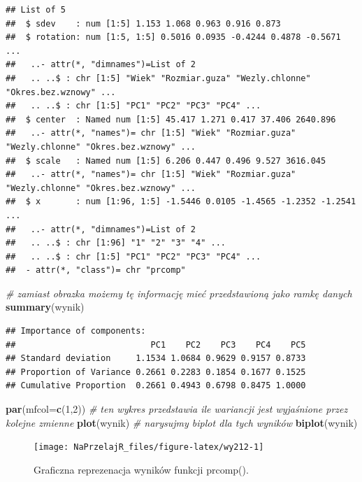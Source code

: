 \documentclass[polish,]{book}
\newenvironment{Shaded}{\begin{snugshade}}{\end{snugshade}}
\newcommand{\CommentTok}[1]{\textcolor[rgb]{0.56,0.35,0.01}{\textit{#1}}}
\newcommand{\DataTypeTok}[1]{\textcolor[rgb]{0.13,0.29,0.53}{#1}}
\newcommand{\DecValTok}[1]{\textcolor[rgb]{0.00,0.00,0.81}{#1}}
\newcommand{\KeywordTok}[1]{\textcolor[rgb]{0.13,0.29,0.53}{\textbf{#1}}}
\newcommand{\NormalTok}[1]{#1}
\begin{document}
\begin{verbatim}
## List of 5
##  $ sdev    : num [1:5] 1.153 1.068 0.963 0.916 0.873
##  $ rotation: num [1:5, 1:5] 0.5016 0.0935 -0.4244 0.4878 -0.5671 ...
##   ..- attr(*, "dimnames")=List of 2
##   .. ..$ : chr [1:5] "Wiek" "Rozmiar.guza" "Wezly.chlonne" "Okres.bez.wznowy" ...
##   .. ..$ : chr [1:5] "PC1" "PC2" "PC3" "PC4" ...
##  $ center  : Named num [1:5] 45.417 1.271 0.417 37.406 2640.896
##   ..- attr(*, "names")= chr [1:5] "Wiek" "Rozmiar.guza" "Wezly.chlonne" "Okres.bez.wznowy" ...
##  $ scale   : Named num [1:5] 6.206 0.447 0.496 9.527 3616.045
##   ..- attr(*, "names")= chr [1:5] "Wiek" "Rozmiar.guza" "Wezly.chlonne" "Okres.bez.wznowy" ...
##  $ x       : num [1:96, 1:5] -1.5446 0.0105 -1.4565 -1.2352 -1.2541 ...
##   ..- attr(*, "dimnames")=List of 2
##   .. ..$ : chr [1:96] "1" "2" "3" "4" ...
##   .. ..$ : chr [1:5] "PC1" "PC2" "PC3" "PC4" ...
##  - attr(*, "class")= chr "prcomp"
\end{verbatim}

\begin{Shaded}
\begin{Highlighting}[]
\CommentTok{# zamiast obrazka możemy tę informację mieć przedstawioną jako ramkę danych}
\KeywordTok{summary}\NormalTok{(wynik)}
\end{Highlighting}
\end{Shaded}

\begin{verbatim}
## Importance of components:
##                           PC1    PC2    PC3    PC4    PC5
## Standard deviation     1.1534 1.0684 0.9629 0.9157 0.8733
## Proportion of Variance 0.2661 0.2283 0.1854 0.1677 0.1525
## Cumulative Proportion  0.2661 0.4943 0.6798 0.8475 1.0000
\end{verbatim}

\begin{Shaded}
\begin{Highlighting}[]
\KeywordTok{par}\NormalTok{(}\DataTypeTok{mfcol=}\KeywordTok{c}\NormalTok{(}\DecValTok{1}\NormalTok{,}\DecValTok{2}\NormalTok{))}
\CommentTok{# ten wykres przedstawia ile wariancji jest wyjaśnione przez kolejne zmienne}
\KeywordTok{plot}\NormalTok{(wynik)}
\CommentTok{# narysujmy biplot dla tych wyników}
\KeywordTok{biplot}\NormalTok{(wynik)}
\end{Highlighting}
\end{Shaded}

\begin{figure}[h]

{\centering \texttt{[image: NaPrzelajR\_files/figure-latex/wy212-1]} 

}

\caption{Graficzna reprezenacja wyników funkcji prcomp().}\label{fig:wy212}
\end{figure}
\end{document}
